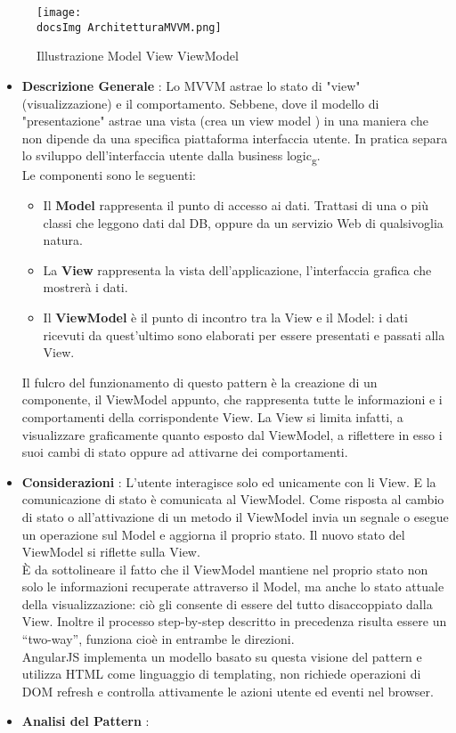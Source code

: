 {{{			\begin{figure}[H]
				\centering
				\texttt{[image: \\docsImg ArchitetturaMVVM.png]}
				\caption{Illustrazione Model View ViewModel}
				\label{Illustrazione Model View ViewModel}
			\end{figure}
			
			\begin{itemize}\itemsep1pt
				\item \textbf{Descrizione Generale} : Lo MVVM astrae lo stato di "view" (visualizzazione) e il comportamento. Sebbene, dove il modello di "presentazione" astrae una vista (crea un view model ) in una maniera che non dipende da una specifica piattaforma interfaccia utente. In pratica separa lo sviluppo dell'interfaccia utente dalla business logic\textsubscript{g}.\\
				Le componenti sono le seguenti:
				\begin{itemize}
					\item Il \textbf{Model} rappresenta il punto di accesso ai dati. Trattasi di una o più classi che leggono dati dal DB, oppure da un servizio Web di qualsivoglia natura.
					\item La \textbf{View} rappresenta la vista dell'applicazione, l'interfaccia grafica che mostrerà i dati.
					\item Il \textbf{ViewModel} è il punto di incontro tra la View e il Model: i dati ricevuti da quest’ultimo sono elaborati per essere presentati e passati alla View.
				\end{itemize}
				Il fulcro del funzionamento di questo pattern è la creazione di un componente, il ViewModel appunto, che rappresenta tutte le informazioni e i comportamenti della corrispondente View. La View si limita infatti, a visualizzare graficamente quanto esposto dal ViewModel, a riflettere in esso i suoi cambi di stato oppure ad attivarne dei comportamenti.
				\item \textbf{Considerazioni} : L'utente interagisce solo ed unicamente con li View. E la comunicazione di stato è comunicata al ViewModel. Come risposta al cambio di stato o all'attivazione di un metodo il ViewModel invia un segnale o esegue un operazione sul Model e aggiorna il proprio stato. Il nuovo stato del ViewModel si riflette sulla View.\\
				È da sottolineare il fatto che il ViewModel mantiene nel proprio stato non solo le informazioni recuperate attraverso il Model, ma anche lo stato attuale della visualizzazione: ciò gli consente di essere del tutto disaccoppiato dalla View. Inoltre il processo step-by-step descritto in precedenza risulta essere un “two-way”, funziona cioè in entrambe le direzioni.\\
				AngularJS implementa un modello basato su questa visione del pattern e utilizza HTML come linguaggio di templating, non richiede operazioni di DOM refresh e controlla attivamente le azioni utente ed eventi nel browser. 
				\item \textbf{Analisi del Pattern} : \hfill
				

\end{itemize}}}}
